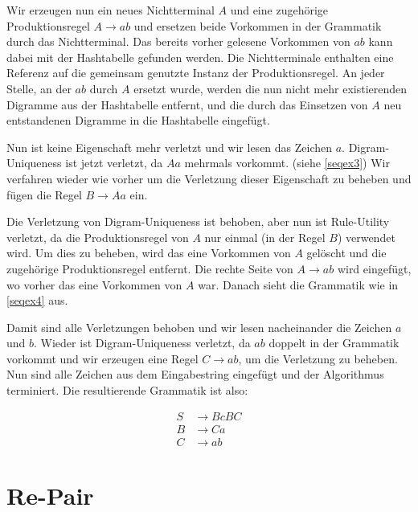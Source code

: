 Wir erzeugen nun ein neues Nichtterminal $A$ und eine zugehörige Produktionsregel $A \rightarrow ab$  und ersetzen beide Vorkommen in der Grammatik durch das Nichtterminal. Das bereits vorher gelesene Vorkommen von $ab$ kann dabei mit der Hashtabelle gefunden werden. 
Die Nichtterminale enthalten eine Referenz auf die gemeinsam genutzte Instanz der Produktionsregel. 
An jeder Stelle, an der $ab$ durch $A$ ersetzt wurde, werden die nun nicht mehr existierenden Digramme aus der Hashtabelle entfernt, und die durch das Einsetzen von $A$ neu entstandenen Digramme in die Hashtabelle eingefügt.

Nun ist keine Eigenschaft mehr verletzt und wir lesen das Zeichen $a$. Digram-Uniqueness ist jetzt verletzt, da $Aa$ mehrmals vorkommt. (siehe \autoref{seqex3})
Wir verfahren wieder wie vorher um die Verletzung dieser Eigenschaft zu beheben und fügen die Regel $B \rightarrow Aa$ ein.

Die Verletzung von Digram-Uniqueness ist behoben, aber nun ist Rule-Utility verletzt, da die Produktionsregel von $A$ nur einmal (in der Regel $B$) verwendet wird.
Um dies zu beheben, wird das eine Vorkommen von $A$ gelöscht und die zugehörige Produktionsregel entfernt. Die rechte Seite von $A \rightarrow ab$ wird eingefügt, wo vorher das eine Vorkommen von $A$ war. Danach sieht die Grammatik wie in \autoref{seqex4} aus.

Damit sind alle Verletzungen behoben und wir lesen nacheinander die Zeichen $a$ und $b$.
Wieder ist Digram-Uniqueness verletzt, da $ab$ doppelt in der Grammatik vorkommt und wir erzeugen eine Regel $C \rightarrow ab$, um die Verletzung zu beheben. Nun sind alle Zeichen aus dem Eingabestring eingefügt und der Algorithmus terminiert. Die resultierende Grammatik ist also:

\begin{align*}
	S &\rightarrow BcBC\\
	B &\rightarrow Ca\\
	C &\rightarrow ab
\end{align*}



\section{Re-Pair}
\label{repair}

